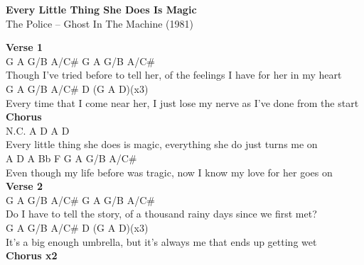 \documentclass[a4paper]{article}
\begin{document}
    \begin{center}
        \textbf{Every Little Thing She Does Is Magic}
        ~\\
        The Police -- Ghost In The Machine (1981)
    \end{center}
    {
        \scriptsize
        \textbf{Verse 1}
        ~\\
        {
            \cutive
            \obeyspaces
              G              A                G/B            A/C\#           G A G/B A/C\#
\\
Though I've tried before to tell her, of the feelings I have for her in my heart
\\
       G                A                G/B            A/C\#                  D  (G A D)(x3)
\\
Every time that I come near her, I just lose my nerve as I've done from the start
\\

        }
        \textbf{Chorus}
        ~\\
        {
            \cutive
            \obeyspaces
N.C.             A                D                    A                D
\\
Every little thing she does is magic, everything she do just turns me on
\\
                A                D                    A                Bb F  G A G/B A/C\#
\\
Even though my life before was tragic, now I know my love for her goes on
\\

        }
        \textbf{Verse 2}
        ~\\
        {
            \cutive
            \obeyspaces
      G                 A          G/B           A/C\#                 G A G/B A/C\#
\\
Do I have to tell the story, of a thousand rainy days since we first met?
\\
        G             A              G/B            A/C\#             D  (G A D)(x3)
\\
It's a big enough umbrella, but it's always me that ends up getting wet
\\

        }
        \textbf{Chorus x2}
        ~\\
        {
            \cutive
            \obeyspaces

}}
\end{document}
